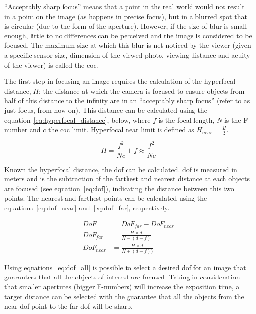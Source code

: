 ``Acceptably sharp focus'' means that a point in the real world would not result in a point on the image (as happens in precise focus), but in a blurred spot that is circular (due to the form of the aperture)\cite{Photopillers}. However, if the size of blur is small enough, little to no differences can be perceived and the image is considered to be focused\cite{Photopillers}. The maximum size at which this blur is not noticed by the viewer (given a specific sensor size, dimension of the viewed photo, viewing distance and acuity of the viewer) is called the \ac{coc}\cite{Photopillers, Merklinger1993}.

The first step in focusing an image requires the calculation of the hyperfocal distance, $H$: the distance at which the camera is focused to ensure objects from half of this distance to the infinity are in an ``acceptably sharp focus'' (refer to as just focus, from now on). This distance can be calculated using the equation~\ref{eq:hyperfocal_distance}, below, where $f$ is the focal length, $N$ is the F-number and $c$ the \ac{coc} limit. Hyperfocal near limit is defined as $H_{near} = \frac{H}{2}$.

\begin{equation}
	\label{eq:hyperfocal_distance}
	H = \frac{f^2}{Nc} + f \approx \frac{f^2}{Nc} 
\end{equation}

Known the hyperfocal distance, the \acf{dof} can be calculated. \ac{dof} is measured in meters and is the subtraction of the farthest and nearest distance at each objects are focused (see equation~\ref{eq:dof}), indicating the distance between this two points\cite{Photopillers, Merklinger1993, mvg_book}. The nearest and farthest points can be calculated using the equations~\ref{eq:dof_near} and~\ref{eq:dof_far}, respectively.

\begin{subequations}
	\label{eq:dof_all}
	\begin{align}
		DoF & = DoF_{far} - DoF_{near} \label{eq:dof} \\
		DoF_{far} & = \frac{H\times d}{H - (d - f)} \label{eq:dof_far} \\
		DoF_{near} & = \frac{H\times d}{H + (d - f))} \label{eq:dof_near} 
	\end{align}
\end{subequations}

Using equations~\ref{eq:dof_all} is possible to select a desired \acl{dof} for an image that guarantees that all the objects of interest are focused. Taking in consideration that smaller apertures (bigger F-numbers) will increase the exposition time\cite{Merklinger1993}, a target distance can be selected with the guarantee that all the objects from the near \ac{dof} point to the far \ac{dof} will be sharp.

